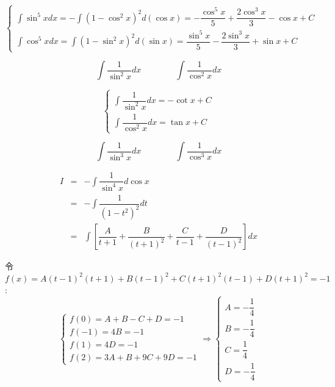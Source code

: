 \begin{corollary}[扩展不定积分]
\begin{solution}
		$$\begin{cases} 
			\int \sin^{5} x dx = -\int (1-\cos^{2} x)^{2} d(\cos x) = -\dfrac{\cos^{5}x}{5} + \dfrac{2\cos^{3}x}{3} -\cos x+C \\ 
			\int \cos^{5} x dx = \int (1-\sin^{2} x)^{2} d(\sin x) = \dfrac{\sin^{5}x}{5} - \dfrac{2\sin^{3}x}{3} + \sin x+C 
		\end{cases}$$
	\end{solution}



	\begin{proposition}
		$$\int \dfrac{1}{\sin^{2}x} dx\qquad\qquad \int \dfrac{1}{\cos^{2} x}dx $$
	\end{proposition}
	\begin{solution}

		$$\begin{cases} 
			\int \dfrac{1}{\sin^{2}x} dx = -\cot x+C\\  
			\int \dfrac{1}{\cos^{2}x} dx = \tan x+C 
		\end{cases}$$
	\end{solution}



	\begin{proposition}
		$$\int \dfrac{1}{\sin^{3}x} dx\qquad\qquad \int \dfrac{1}{\cos^{3} x}dx $$
	\end{proposition}
	\begin{solution}
		\begin{eqnarray*}
			I & = & -\int \dfrac{1}{\sin^4 x}d\cos x\\
			  & = & -\int \dfrac{1}{(1-t^2)^2}dt\\
			  & = & \int\left[ \dfrac{A}{t+1}+\dfrac{B}{(t+1)^2}+\dfrac{C}{t-1}+\dfrac{D}{(t-1)^2}\right]dx 
		\end{eqnarray*}

		令 $f(x)=A(t-1)^2(t+1)+B(t-1)^2+C(t+1)^2(t-1)+D(t+1)^2=-1$:  
		$$\begin{cases}
			f(0)=A+B-C+D=-1\\
			f(-1)=4B=-1\\
			f(1)=4D=-1\\
			f(2)=3A+B+9C+9D=-1
		\end{cases} \Rightarrow
		\begin{cases}
			A=-\dfrac{1}{4}\\
			B=-\dfrac{1}{4}\\
			C=\dfrac{1}{4}\\
			D=-\dfrac{1}{4}
		\end{cases}$$
	 

\end{solution}
\end{corollary}
